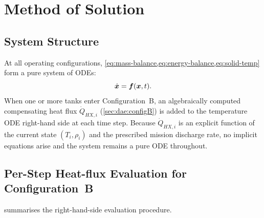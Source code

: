 \section{Method of Solution}
\label{sec:method}

\subsection{System Structure}
\label{sec:method:structure}

At all operating configurations, \cref{eq:mass-balance,eq:energy-balance,eq:solid-temp}
form a pure system of ODEs:
\begin{equation}
  \dot{\bm{x}} = \bm{f}(\bm{x}, t).
\end{equation}
When one or more tanks enter Configuration~B, an algebraically computed
compensating heat flux $\dot{Q}_{HX,i}$ (\cref{sec:dae:configB}) is added to
the temperature ODE right-hand side at each time step.  Because
$\dot{Q}_{HX,i}$ is an explicit function of the current state $(T_i, \rho_i)$
and the prescribed mission discharge rate, no implicit equations arise and the
system remains a pure ODE throughout.

\subsection{Per-Step Heat-flux Evaluation for Configuration~B}
\label{sec:method:configB-solve}

 summarises the right-hand-side evaluation procedure.

